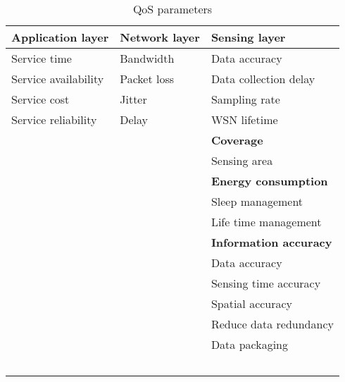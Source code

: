 \begin{table}[h!]
\scriptsize
	\begin{tabulary}{\textwidth}{L|L|L}
	\textbf{Application layer} & \textbf{Network layer} & \textbf{Sensing layer }        \\\hline
	Service time               & Bandwidth              & Data accuracy                  \\
	Service availability       & Packet loss            & Data collection delay          \\
	Service cost               & Jitter                 & Sampling rate                  \\
	Service reliability        & Delay                  & WSN lifetime                   \\
	\                          &                        & \textbf{Coverage}              \\
	\                          &                        & Sensing area                   \\
	\                          &                        & \textbf{Energy consumption}    \\
	\                          &                        & Sleep management               \\
	\                          &                        & Life time management           \\
	\                          &                        & \textbf{Information accuracy}  \\
	\                          &                        & Data accuracy                  \\
	\                          &                        & Sensing time accuracy          \\
	\                          &                        & Spatial accuracy               \\
	\                          &                        & Reduce data redundancy         \\
	\                          &                        & Data packaging                 \\
	\                          &                        &                                \\\hline
	\end{tabulary}
\caption{\label{tab:} QoS parameters \cite{meshinchi_qosaware_2018} \cite{chowdhury_survey_2018}}
\end{table}




